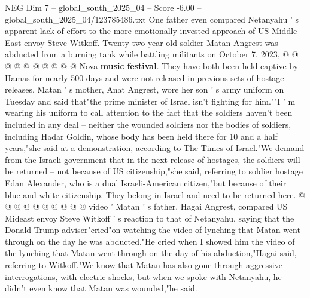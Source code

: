 \begin{textsample}{NEG Dim 7 – global\_south\_2025\_04 – Score -6.00 – global\_south\_2025\_04/123785486.txt}
One father even compared Netanyahu ' s apparent lack of effort to the more emotionally invested approach of US Middle East envoy Steve Witkoff.
Twenty-two-year-old soldier Matan Angrest was abducted from a burning tank while battling militants on October 7, 2023, @ @ @ @ @ @ @ @ @ @ Nova \textbf{music} \textbf{festival}.
They have both been held captive by Hamas for nearly 500 days and were not released in previous sets of hostage releases.
Matan ' s mother, Anat Angrest, wore her son ' s army uniform on Tuesday and said that"the prime minister of Israel isn't fighting for him.""I ' m wearing his uniform to call attention to the fact that the soldiers haven't been included in any deal -- neither the wounded soldiers nor the bodies of soldiers, including Hadar Goldin, whose body has been held there for 10 and a half years,"she said at a demonstration, according to The Times of Israel."We demand from the Israeli government that in the next release of hostages, the soldiers will be returned -- not because of US citizenship,"she said, referring to soldier hostage Edan Alexander, who is a dual Israeli-American citizen,"but because of their blue-and-white citizenship.
They belong in Israel and need to be returned here. @ @ @ @ @ @ @ @ @ @ video ' Matan ' s father, Hagai Angrest, compared US Mideast envoy Steve Witkoff ' s reaction to that of Netanyahu, saying that the Donald Trump adviser"cried"on watching the video of lynching that Matan went through on the day he was abducted."He cried when I showed him the video of the lynching that Matan went through on the day of his abduction,"Hagai said, referring to Witkoff."We know that Matan has also gone through aggressive interrogations, with electric shocks, but when we spoke with Netanyahu, he didn't even know that Matan was wounded,"he said.

\end{textsample}
